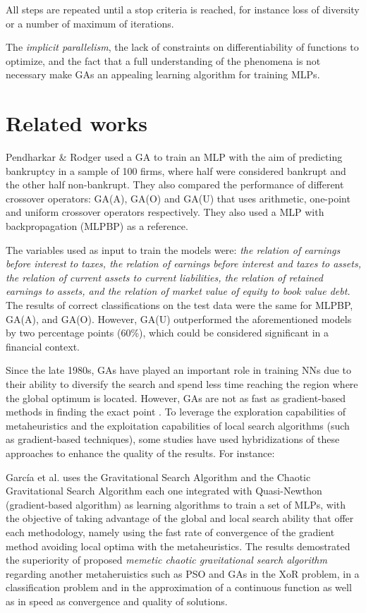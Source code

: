 \documentclass[journal]{IEEEtai}
\begin{document}
All steps are repeated until a stop criteria is reached, for instance loss of diversity or a number of maximum of iterations.


The \textit{implicit parallelism}, the lack of constraints on differentiability of functions to optimize, and the fact that a full understanding of the phenomena is not necessary make GAs an appealing learning algorithm for training MLPs.


\section{Related works}

Pendharkar \& Rodger \cite{GR1} used a GA to train an MLP with the aim of predicting bankruptcy in a sample of 100 firms, where half were considered bankrupt and the other half non-bankrupt. They also compared the performance of different crossover operators: GA(A), GA(O) and GA(U) that uses arithmetic, one-point and uniform crossover operators respectively. They also used a MLP with backpropagation (MLPBP) as a reference.



 

The variables used as input to train the models were: \textit{ the relation of earnings before interest to taxes, the relation of earnings before interest and taxes to assets, the relation of current assets to current liabilities, the relation of retained earnings to assets, and the relation of market value of equity to book value debt.} The results of correct classifications on the test data were the same for MLPBP, GA(A), and GA(O). However, GA(U) outperformed the aforementioned models by two percentage points (60\%), which could be considered significant in a financial context.
 

Since the late 1980s, GAs have played an important role in training NNs due to their ability to diversify the search and spend less time reaching the region where the global optimum is located. However, GAs are not as fast as gradient-based methods in finding the exact point  \cite{NI*}. To leverage the exploration capabilities of metaheuristics and the exploitation capabilities of local search algorithms (such as gradient-based techniques), some studies have used hybridizations of these approaches to enhance the quality of the results. For instance:

García et al. \cite{MMN} uses the Gravitational Search Algorithm and the Chaotic Gravitational Search Algorithm each one integrated with Quasi-Newthon (gradient-based algorithm) as learning algorithms to train a  set of MLPs, with the objective of taking advantage of the global and local search ability that offer each methodology, namely  using the fast rate of convergence  of the gradient method avoiding local optima with the metaheuristics. The results demostrated the superiority of proposed \textit{memetic chaotic gravitational search algorithm}  regarding another metaheruistics such as PSO and GAs  in the XoR problem, in a classification problem and in the  approximation of a continuous function as well as in speed as convergence and quality of solutions.
\end{document}
